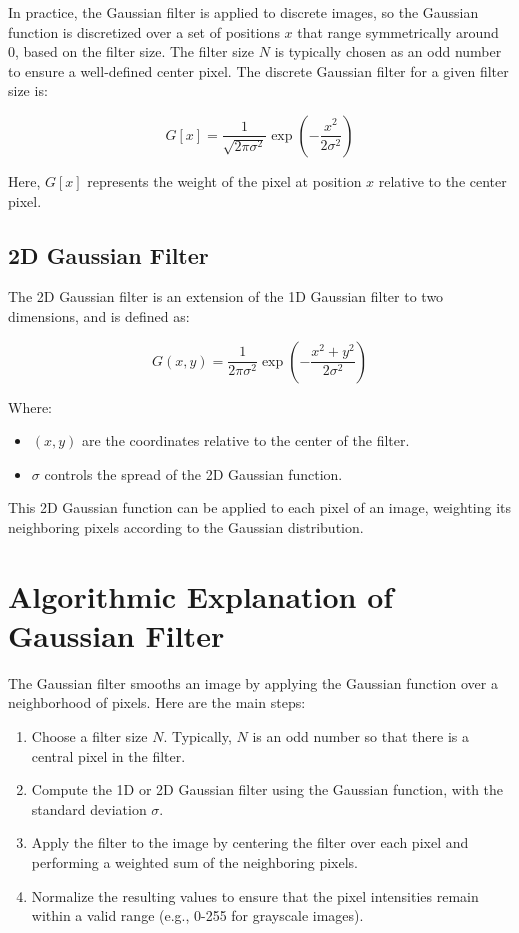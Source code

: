 \documentclass{article}
\begin{document}
In practice, the Gaussian filter is applied to discrete images, so the Gaussian function is discretized over a set of positions \( x \) that range symmetrically around 0, based on the filter size. The filter size \( N \) is typically chosen as an odd number to ensure a well-defined center pixel. The discrete Gaussian filter for a given filter size is:

\[
G[x] = \frac{1}{\sqrt{2\pi\sigma^2}} \exp\left(-\frac{x^2}{2\sigma^2}\right)
\]

Here, \( G[x] \) represents the weight of the pixel at position \( x \) relative to the center pixel.

\subsection{2D Gaussian Filter}

The 2D Gaussian filter is an extension of the 1D Gaussian filter to two dimensions, and is defined as:

\[
G(x, y) = \frac{1}{2\pi\sigma^2} \exp\left(-\frac{x^2 + y^2}{2\sigma^2}\right)
\]

Where:
\begin{itemize}
    \item \( (x, y) \) are the coordinates relative to the center of the filter.
    \item \( \sigma \) controls the spread of the 2D Gaussian function.
\end{itemize}

This 2D Gaussian function can be applied to each pixel of an image, weighting its neighboring pixels according to the Gaussian distribution.

\section{Algorithmic Explanation of Gaussian Filter}

The Gaussian filter smooths an image by applying the Gaussian function over a neighborhood of pixels. Here are the main steps:

\begin{enumerate}
    \item Choose a filter size \( N \). Typically, \( N \) is an odd number so that there is a central pixel in the filter.
    \item Compute the 1D or 2D Gaussian filter using the Gaussian function, with the standard deviation \( \sigma \).
    \item Apply the filter to the image by centering the filter over each pixel and performing a weighted sum of the neighboring pixels.
    \item Normalize the resulting values to ensure that the pixel intensities remain within a valid range (e.g., 0-255 for grayscale images).
\end{enumerate}
\end{document}
